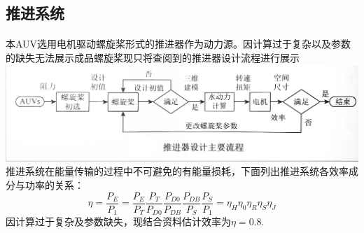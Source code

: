 \documentclass{ctexart}
\begin{document}
\subsection{推进系统}
\paragraph{}本AUV选用电机驱动螺旋桨形式的推进器作为动力源。因计算过于复杂以及参数的缺失无法展示成品螺旋桨现只将查阅到的推进器设计流程进行展示 \\
\includegraphics[scale=0.3]{./nengyuanyudongli.jpg}
推进系统在能量传输的过程中不可避免的有能量损耗，下面列出推进系统各效率成分与功率的关系：\\
\[\eta=\frac{P_E}{P_1}=\frac{P_E}{P_T}\frac{P_T}{P_{D0}}\frac{P_{D0}}{P_{DB}}\frac{P_{DB}}{P_S}\frac{P_S}{P_1}=\eta_H\eta_0\eta_R\eta_S\eta_J\]
因计算过于复杂及参数缺失，现结合资料估计效率为$\eta=0.8$.
\end{document}
